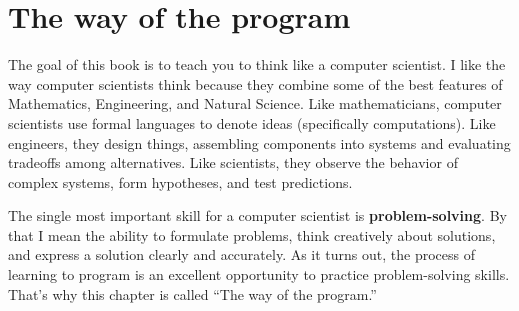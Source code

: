 





\chapter{The way of the program}

The goal of this book is to teach you to think like a
computer scientist.  I like the way computer scientists think because
they combine some of the best features of Mathematics, Engineering,
and Natural Science.  Like mathematicians, computer scientists use formal
languages to denote ideas (specifically computations).  Like
engineers, they design things, assembling components into systems and
evaluating tradeoffs among alternatives.  Like scientists,
they observe the behavior of complex systems, form hypotheses, and test
predictions.

The single most important skill for a computer scientist is {\bf
problem-solving}.  By that I mean the ability to formulate problems,
think creatively about solutions, and express a solution clearly and
accurately.  As it turns out, the process of learning to program is an
excellent opportunity to practice problem-solving skills.  That's why
this chapter is called ``The way of the program.''

